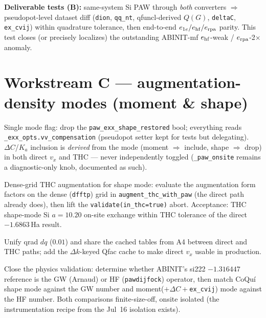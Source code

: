 \documentclass[11pt]{article}
\newcommand{\code}[1]{\texttt{\small #1}}
\begin{document}
\textbf{Deliverable tests (B):} same-system Si PAW through \emph{both}
converters $\Rightarrow$ pseudopot-level dataset diff (\code{dion},
\code{qq\_nt}, qfuncl-derived $Q(G)$, \code{deltaC}, \code{ex\_cvij})
within quadrature tolerance, then end-to-end $e_{1e}/e_{\rm hf}/e_{\rm rpa}$
parity. This test closes (or precisely localizes) the outstanding
ABINIT-mf $e_{\rm hf}$-weak / $e_{\rm rpa}$-2$\times$ anomaly.

\section{Workstream C --- augmentation-density modes (moment \& shape)}
\label{sec:wsC}

\begin{description}[leftmargin=2.6em,style=nextline]
\item[C1.] Single mode flag: drop the \code{paw\_exx\_shape\_restored}
bool; everything reads \code{\_exx\_opts.vv\_compensation} (pseudopot
setter kept for tests but delegating). $\Delta C$/$K_a$ inclusion is
\emph{derived} from the mode (moment $\Rightarrow$ include, shape
$\Rightarrow$ drop) in both direct $v_x$ and THC --- never independently
toggled (\code{\_paw\_onsite} remains a diagnostic-only knob, documented as
such).

\item[C2.] Dense-grid THC augmentation for shape mode: evaluate the
augmentation form factors on the dense (\code{dfftp}) grid in
\code{augment\_thc\_with\_paw} (the direct path already does), then lift
the \code{validate(in\_thc=true)} abort. Acceptance: THC shape-mode Si
$a{=}10.20$ on-site exchange within THC tolerance of the direct
$-1.6863$\,Ha result.

\item[C3.] Unify qrad $dq$ ($0.01$) and share the cached tables from A4
between direct and THC paths; add the $\Delta k$-keyed Qfac cache to make
direct $v_x$ usable in production.

\item[C4.] Close the physics validation: determine whether ABINIT's si222
$-1.316447$ reference is the GW (Arnaud) or HF (\code{pawdijfock})
operator, then match CoQu\'i shape mode against the GW number and
moment($+\Delta C+$\code{ex\_cvij}) mode against the HF number. Both
comparisons finite-size-off, onsite isolated (the instrumentation recipe
from the Jul~16 isolation exists).
\end{description}
\end{document}
